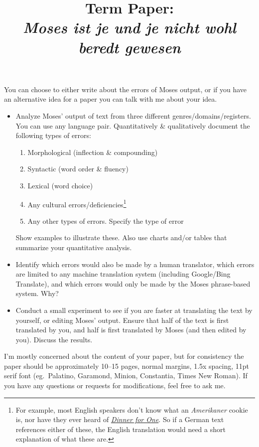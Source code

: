\documentclass[11pt]{article}
\title{Term Paper: \\[1.0em] \Large{\textit{Moses ist je und je nicht wohl beredt gewesen}}}
\begin{document}
\maketitle


\begin{spacing}{1.35}

You can choose to either write about the errors of Moses output, or if you have an alternative idea for a paper you can talk with me about your idea.

\begin{itemize}
\item Analyze Moses' output of text from three different genres/domains/registers.
	You can use any language pair.
	Quantitatively \& qualitatively document the following types of errors:
 \begin{spacing}{0.9}
 \begin{enumerate}
  \item Morphological (inflection \& compounding)
  \item Syntactic (word order \& fluency)
  \item Lexical (word choice)
  \item Any cultural errors/deficiencies\footnote{For example, most English speakers don't know what an \textit{Amerikaner} cookie is, nor have they ever heard of \href{https://en.wikipedia.org/wiki/Dinner_for_One}{\textit{Dinner for One}}.  So if a German text references either of these, the English translation would need a short explanation of what these are.}
  \item Any other types of errors.  Specify the type of error
 \end{enumerate}
 \end{spacing}

 Show examples to illustrate these.
 Also use charts and/or tables that summarize your quantitative analysis.

\item Identify which errors would also be made by a human translator, which errors are limited to any machine translation system (including Google/Bing Translate), and which errors would only be made by the Moses phrase-based system.
	Why?

\item Conduct a small experiment to see if you are faster at translating the text by yourself, or editing Moses' output.
	Ensure that half of the text is first translated by you, and half is first translated by Moses (and then edited by you).
	Discuss the results.

\end{itemize}

I'm mostly concerned about the content of your paper, but for consistency the paper should be approximately 10--15 pages, normal margins, 1.5x spacing, 11pt serif font (eg.~Palatino, Garamond, Minion, Constantia, Times New Roman).
If you have any questions or requests for modifications, feel free to ask me.


\end{spacing}
%
\end{document}
